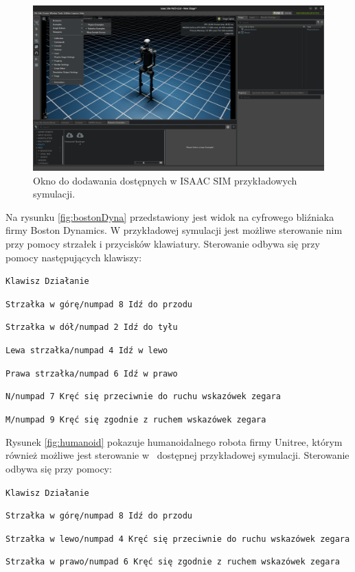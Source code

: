 \documentclass[12pt]{article}
\begin{document}
\begin{figure}[h]
    \centering
    \includegraphics[width=0.8\linewidth]{Zdjęcia/oknoZPrzykladami.png}
    \caption{Okno do dodawania dostępnych w ISAAC SIM przykładowych symulacji.}
    \label{fig:symulacje}
\end{figure}

\newpage

Na rysunku \ref{fig:bostonDyna} przedstawiony jest widok na cyfrowego bliźniaka firmy Boston Dynamics. W przykładowej symulacji jest możliwe sterowanie nim przy pomocy strzałek i przycisków klawiatury. Sterowanie odbywa się przy pomocy następujących klawiszy: 

\texttt{Klawisz  Działanie}

\texttt{Strzałka w górę/numpad 8  Idź do przodu}

\texttt{Strzałka w dół/numpad 2  Idź do tyłu}

\texttt{Lewa strzałka/numpad 4  Idź w lewo}

\texttt{Prawa strzałka/numpad 6  Idź w prawo}

\texttt{N/numpad 7  Kręć się przeciwnie do ruchu wskazówek zegara}

\texttt{M/numpad 9 Kręć się zgodnie z ruchem wskazówek zegara}

Rysunek \ref{fig:humanoid} pokazuje humanoidalnego robota firmy Unitree, którym również możliwe jest sterowanie w~ dostępnej przykładowej symulacji. Sterowanie odbywa się przy pomocy:

\texttt{Klawisz  Działanie}

\texttt{Strzałka w górę/numpad 8  Idź do przodu}

\texttt{Strzałka w lewo/numpad 4 Kręć się przeciwnie do ruchu wskazówek zegara}

\texttt{Strzałka w prawo/numpad 6 Kręć się zgodnie z ruchem wskazówek zegara}
\end{document}
